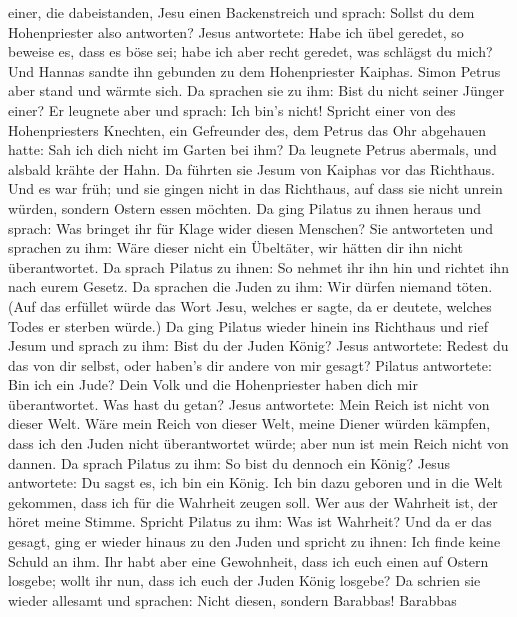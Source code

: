 einer, die dabeistanden, Jesu einen Backenstreich und sprach: Sollst du
dem Hohenpriester also antworten?  Jesus antwortete: Habe
ich übel geredet, so beweise es, dass es böse sei; habe ich aber recht
geredet, was schlägst du mich?  Und Hannas sandte ihn
gebunden zu dem Hohenpriester Kaiphas.  Simon Petrus aber
stand und wärmte sich. Da sprachen sie zu ihm: Bist du nicht seiner
Jünger einer? Er leugnete aber und sprach: Ich bin's nicht!
 Spricht einer von des Hohenpriesters Knechten, ein
Gefreunder des, dem Petrus das Ohr abgehauen hatte: Sah ich dich nicht
im Garten bei ihm?  Da leugnete Petrus abermals, und
alsbald krähte der Hahn.  Da führten sie Jesum von Kaiphas
vor das Richthaus. Und es war früh; und sie gingen nicht in das
Richthaus, auf dass sie nicht unrein würden, sondern Ostern essen
möchten.  Da ging Pilatus zu ihnen heraus und sprach: Was
bringet ihr für Klage wider diesen Menschen?  Sie
antworteten und sprachen zu ihm: Wäre dieser nicht ein Übeltäter, wir
hätten dir ihn nicht überantwortet.  Da sprach Pilatus zu
ihnen: So nehmet ihr ihn hin und richtet ihn nach eurem Gesetz. Da
sprachen die Juden zu ihm: Wir dürfen niemand töten.  (Auf
das erfüllet würde das Wort Jesu, welches er sagte, da er deutete,
welches Todes er sterben würde.)  Da ging Pilatus wieder
hinein ins Richthaus und rief Jesum und sprach zu ihm: Bist du der Juden
König?  Jesus antwortete: Redest du das von dir selbst,
oder haben's dir andere von mir gesagt?  Pilatus
antwortete: Bin ich ein Jude? Dein Volk und die Hohenpriester haben dich
mir überantwortet. Was hast du getan?  Jesus antwortete:
Mein Reich ist nicht von dieser Welt. Wäre mein Reich von dieser Welt,
meine Diener würden kämpfen, dass ich den Juden nicht überantwortet
würde; aber nun ist mein Reich nicht von dannen.  Da sprach
Pilatus zu ihm: So bist du dennoch ein König? Jesus antwortete: Du sagst
es, ich bin ein König. Ich bin dazu geboren und in die Welt gekommen,
dass ich für die Wahrheit zeugen soll. Wer aus der Wahrheit ist, der
höret meine Stimme.  Spricht Pilatus zu ihm: Was ist
Wahrheit? Und da er das gesagt, ging er wieder hinaus zu den Juden und
spricht zu ihnen: Ich finde keine Schuld an ihm.  Ihr habt
aber eine Gewohnheit, dass ich euch einen auf Ostern losgebe; wollt ihr
nun, dass ich euch der Juden König losgebe?  Da schrien sie
wieder allesamt und sprachen: Nicht diesen, sondern Barabbas! Barabbas
